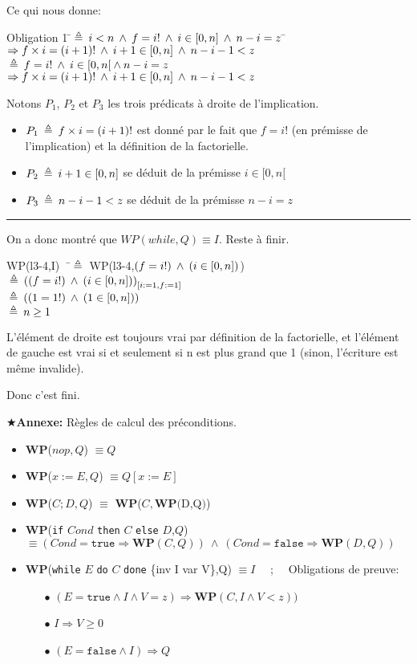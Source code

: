 \documentclass[10pt]{article}\usepackage[correction,nu]{esial}
\newcommand{\WP}[1]{\textbf{WP}($#1$)}
\begin{document}
\begin{Reponse}
  Ce qui nous donne:
  \begin{tabbing}
  Obligation 1 \=$\:\triangleq\: i<n \:\wedge\: f=i! \:\wedge\: i\in[0,n] \:\wedge\: n-i=z$
  \=$\Rightarrow f\times i=(i+1)! \:\wedge\: i+1\in[0,n] \:\wedge\: n-i-1<z$\\
  \>$\:\triangleq\: f=i! \:\wedge\: i\in[0,n[ \:\wedge\: n-i=z$
  \>$\Rightarrow  f\times i=(i+1)! \:\wedge\:  i+1\in[0,n] \:\wedge\: n-i-1<z$  
  \end{tabbing}
  Notons $P_1$, $P_2$ et $P_3$ les trois prédicats à droite de
  l'implication.
  \begin{itemize}
  \item $P_1\:\triangleq\: f\times i=(i+1)!$ est donné par le fait que $f=i!$ (en prémisse
    de l'implication) et la définition de la factorielle.
  \item $P_2\:\triangleq\: i+1\in[0,n]$ se déduit de la prémisse $i\in[0,n[$
  \item $P_3\:\triangleq\: n-i-1<z$ se déduit de la prémisse $n-i=z$
  \end{itemize}

  \hrule

  On a donc montré que $WP(while,Q)\equiv I$. Reste à finir.

  \noindent
  \begin{tabbing}
  WP(l3-4,I)~~\=$\:\triangleq\:$ WP(l3-4,$(f=i!)\:\wedge\: (i\in[0,n])$)\\    
  \>$\:\triangleq\:\left((f=i!)\:\wedge\: (i\in[0,n])\right)_{[i:=1,f:=1]}$\\    
  \>$\:\triangleq\:\left((1=1!)\:\wedge\: (1\in[0,n])\right)$    \\
  \>$\:\triangleq\: n\geq 1$  
  \end{tabbing}
  L'élément de droite est toujours vrai par définition de la factorielle, et
  l'élément de gauche est vrai si et seulement si n est plus grand que 1
  (sinon, l'écriture est même invalide).

  Donc c'est fini. 
\end{Reponse}

\bigskip
\noindent\hspace{-1.3em}$\bigstar$\textbf{Annexe:} Règles de calcul des
préconditions. 

\begin{itemize}
\item \WP{nop, Q}  $\equiv Q$
\item \WP{x:=E, Q} $\equiv Q[x:=E]$
\item \WP{C;D, Q}  $\equiv$ \WP{C, \WP{D,Q}}
\item \textbf{WP}(\texttt{if} $Cond$ \texttt{then} $C$ \texttt{else} $D$,$Q$)
  $\equiv (Cond=\mathtt{true}\Rightarrow \mathbf{WP}(C,Q))~\wedge~
          (Cond=\mathtt{false}\Rightarrow \mathbf{WP}(D,Q))$
\item \textbf{WP}(\texttt{while} $E$ \texttt{do} $C$ \texttt{done} \{inv I var
  V\},Q)  $\equiv I$ ~~;~~  Obligations de preuve:
  \begin{enumerate}
  \item[$\bullet$] $(E=\mathtt{true}\wedge I\wedge V=z) \Rightarrow
    \mathbf{WP}(C,I\wedge V<z))$
  \item[$\bullet$] $I\Rightarrow V\geq 0$
  \item[$\bullet$] $(E=\mathtt{false}\wedge I) \Rightarrow Q$
  \end{enumerate}
\end{itemize}
\end{document}
